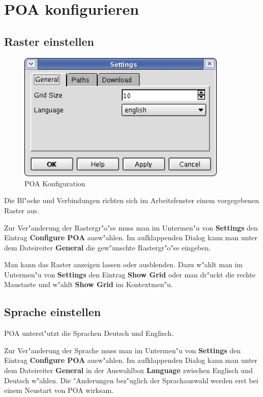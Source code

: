 \documentclass[a4paper,titlepage,12pt,ngerman]{scrbook}
\begin{document}
\newpage
\section{POA konfigurieren}

\subsection{Raster einstellen}
\begin{figure}[htbp]

\begin{center}

\includegraphics[width=10cm]{POAConfiguration1}

\caption{POA Konfiguration}\label{test}

\end{center}

\end{figure}
Die Bl"ocke und Verbindungen richten sich im Arbeitsfenster einem vorgegebenen Raster aus.\par

Zur Ver"anderung der Rastergr"o"se muss man im Untermen"u von {\bf Settings} den Eintrag {\bf Configure POA} ausw"ahlen. Im aufklappenden Dialog kann man unter dem Dateireiter {\bf General} die gew"unschte Rastergr"o"se eingeben.\par
Man kann das Raster anzeigen lassen oder ausblenden. Dazu w"ahlt man im Untermen"u von {\bf Settings} den Eintrag {\bf Show Grid} oder man dr"uckt die rechte Maustaste und w"ahlt {\bf Show Grid} im Kontextmen"u.


\subsection{Sprache einstellen}
POA unterst"utzt die Sprachen Deutsch und Englisch.\par
Zur Ver"anderung der Sprache muss man im Untermen"u von {\bf Settings} den Eintrag {\bf Configure POA} ausw"ahlen. Im aufklappenden Dialog kann man unter dem Dateireiter {\bf General} in der Auswahlbox {\bf Language} zwischen Englisch und Deutsch w"ahlen. Die "Anderungen bez"uglich der Sprachauswahl werden erst bei einem Neustart von POA wirksam.\par
\end{document}
